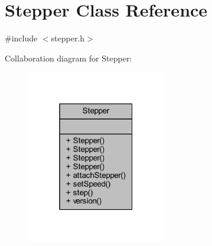 \hypertarget{class_stepper}{}\section{Stepper Class Reference}
\label{class_stepper}


{\ttfamily \#include $<$stepper.\+h$>$}



Collaboration diagram for Stepper\+:
\nopagebreak
\begin{figure}[H]
\begin{center}
\leavevmode
\includegraphics[width=172pt]{de/dd0/class_stepper__coll__graph}
\end{center}
\end{figure}
